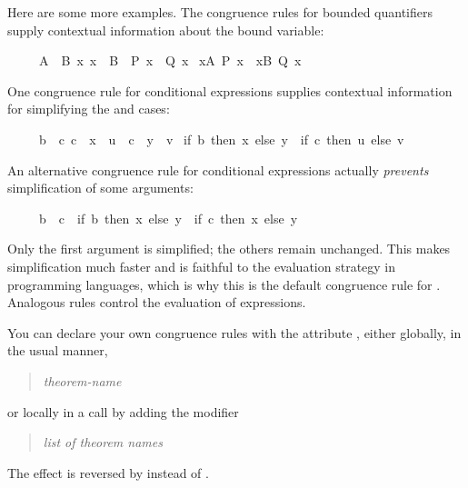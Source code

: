 \begin{isabellebody}
\begin{isamarkuptext}
Here are some more examples.  The congruence rules for bounded
quantifiers supply contextual information about the bound variable:
\begin{isabelle}%
\ \ \ \ \ {\isasymlbrakk}A\ {\isacharequal}\ B{\isacharsemicolon}\ {\isasymAnd}x{\isachardot}\ x\ {\isasymin}\ B\ {\isasymLongrightarrow}\ P\ x\ {\isacharequal}\ Q\ x{\isasymrbrakk}\isanewline
\isaindent{\ \ \ \ \ }{\isasymLongrightarrow}\ {\isacharparenleft}{\isasymforall}x{\isasymin}A{\isachardot}\ P\ x{\isacharparenright}\ {\isacharequal}\ {\isacharparenleft}{\isasymforall}x{\isasymin}B{\isachardot}\ Q\ x{\isacharparenright}%
\end{isabelle}
One congruence rule for conditional expressions supplies contextual
information for simplifying the  and  cases:
\begin{isabelle}%
\ \ \ \ \ {\isasymlbrakk}b\ {\isacharequal}\ c{\isacharsemicolon}\ c\ {\isasymLongrightarrow}\ x\ {\isacharequal}\ u{\isacharsemicolon}\ {\isasymnot}\ c\ {\isasymLongrightarrow}\ y\ {\isacharequal}\ v{\isasymrbrakk}\isanewline
\isaindent{\ \ \ \ \ }{\isasymLongrightarrow}\ {\isacharparenleft}if\ b\ then\ x\ else\ y{\isacharparenright}\ {\isacharequal}\ {\isacharparenleft}if\ c\ then\ u\ else\ v{\isacharparenright}%
\end{isabelle}
An alternative congruence rule for conditional expressions
actually \emph{prevents} simplification of some arguments:
\begin{isabelle}%
\ \ \ \ \ b\ {\isacharequal}\ c\ {\isasymLongrightarrow}\ {\isacharparenleft}if\ b\ then\ x\ else\ y{\isacharparenright}\ {\isacharequal}\ {\isacharparenleft}if\ c\ then\ x\ else\ y{\isacharparenright}%
\end{isabelle}
Only the first argument is simplified; the others remain unchanged.
This makes simplification much faster and is faithful to the evaluation
strategy in programming languages, which is why this is the default
congruence rule for . Analogous rules control the evaluation of
 expressions.

You can declare your own congruence rules with the attribute ,
either globally, in the usual manner,
\begin{quote}
 \textit{theorem-name} 
\end{quote}
or locally in a  call by adding the modifier
\begin{quote}
 \textit{list of theorem names}
\end{quote}
The effect is reversed by  instead of .


\end{isamarkuptext}
\end{isabellebody}
